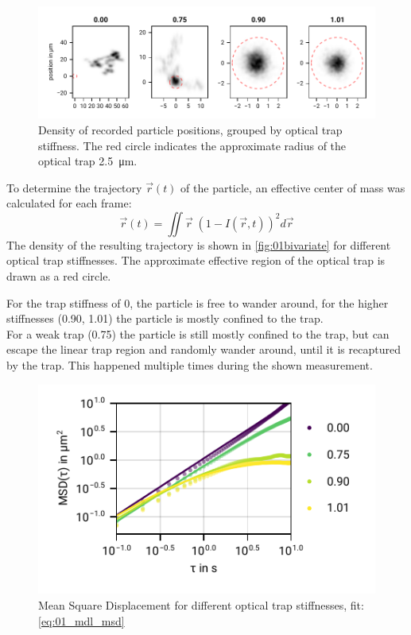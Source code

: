 \documentclass[
    twoside=false,
    twocolumn=true,
    fontsize=11pt,
]{scrarticle}
\begin{document}
\begin{figure}
    \centering
    \includegraphics{figures/01_03_1_bivariate.pdf}
    \caption{Density of recorded particle positions, grouped by optical trap stiffness. The red circle indicates the approximate radius of the optical trap \SI{2.5}{\micro m}.}
    \label{fig:01bivariate}
\end{figure}
To determine the trajectory $\vec r(t)$ of the particle, an effective center of mass was calculated for each frame:
\begin{equation}
    \vec{r}(t) = \iint \vec{r} \; \left(1-I(\vec{r}, t)\right)^2 d\vec{r}    
\end{equation}
The density of the resulting trajectory is shown in \autoref{fig:01bivariate} for different optical trap stiffnesses.
The approximate effective region of the optical trap is drawn as a red circle.

For the trap stiffness of \SI{0}{}, the particle is free to wander around, for the higher stiffnesses (\SI{0.90}{}, \SI{1.01}{}) the particle is mostly confined to the trap.\\
For a weak trap (\SI{0.75}{}) the particle is still mostly confined to the trap, but can escape the linear trap region and randomly wander around, until it is recaptured by the trap.
This happened multiple times during the shown measurement.

\begin{figure}
    \centering
    \includegraphics{figures/01_02_2_msd.pdf}
    \caption{Mean Square Displacement for different optical trap stiffnesses, fit: \autoref{eq:01_mdl_msd}}
    \label{fig:01msd}
\end{figure}
\end{document}
